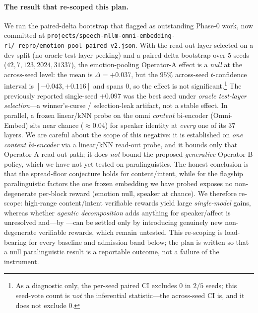 \paragraph{The result that re-scoped this plan.} We ran the paired-delta bootstrap that  flagged as outstanding Phase-0 work, now committed at \texttt{projects/speech-mllm-omni-embedding-rl/\_repro/emotion\_pool\_paired\_v2.json}. With the read-out layer selected on a dev split (no oracle test-layer peeking) and a paired-delta bootstrap over $5$ seeds ($42,7,123,2024,31337$), the emotion-pooling Operator-A effect is a \emph{null} at the across-seed level: the mean is $\Delta=+0.037$, but the $95\%$ across-seed $t$-confidence interval is $[-0.043,+0.116]$ and spans $0$, so the effect is not significant.\footnote{As a diagnostic only, the per-seed paired CI excludes $0$ in $2/5$ seeds; this seed-vote count is \emph{not} the inferential statistic---the across-seed CI is, and it does not exclude $0$.} The previously reported single-seed $+0.097$ was the best seed under \emph{oracle test-layer selection}---a winner's-curse / selection-leak artifact, not a stable effect. In parallel, a frozen linear/kNN probe on the omni \emph{content} bi-encoder (Omni-Embed) sits near chance ($\approx 0.04$) for speaker identity at \emph{every} one of its $37$ layers. We are careful about the scope of this negative: it is established on \emph{one content bi-encoder} via a linear/kNN read-out probe, and it bounds only that Operator-A read-out path; it does \emph{not} bound the proposed \emph{generative} Operator-B policy, which we have not yet tested on paralinguistics. The honest conclusion is that the spread-floor conjecture holds for content/intent, while for the flagship paralinguistic factors the one frozen embedding we have probed exposes no non-degenerate per-block reward (emotion null, speaker at chance). We therefore re-scope: high-range content/intent verifiable rewards yield large \emph{single-model} gains, whereas whether \emph{agentic decomposition} adds anything for speaker/affect is unresolved and---by ---can be settled only by introducing genuinely new non-degenerate verifiable rewards, which remain untested. This re-scoping is load-bearing for every baseline and admission band below; the plan is written so that a null paralinguistic result is a reportable outcome, not a failure of the instrument.

